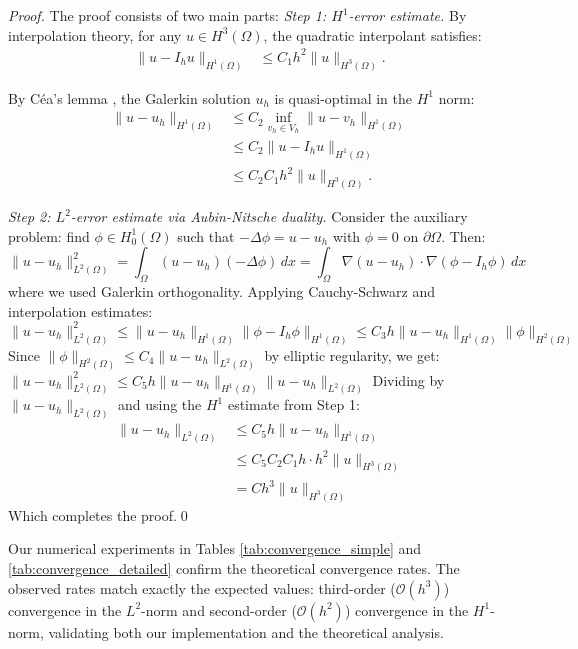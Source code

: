 \documentclass[a4paper,10pt]{article}
\begin{document}
\begin{proof}{}{}
	The proof consists of two main parts:
	\textit{Step 1: $H^1$-error estimate.}
	By interpolation theory, for any $u \in H^3(\Omega)$, the quadratic interpolant satisfies:
	\begin{align}
		\|u - I_h u\|_{H^1(\Omega)} & \leq C_1 h^2 \|u\|_{H^3(\Omega)}.
	\end{align}

	By Céa's lemma \cite{ciarlet1978finite}, the Galerkin solution $u_h$ is quasi-optimal in the $H^1$ norm:
	\begin{align}
		\|u - u_h\|_{H^1(\Omega)} & \leq C_2 \inf_{v_h \in V_h} \|u - v_h\|_{H^1(\Omega)} \\
		                          & \leq C_2 \|u - I_h u\|_{H^1(\Omega)}                  \\
		                          & \leq C_2 C_1 h^2 \|u\|_{H^3(\Omega)}.
	\end{align}

	\textit{Step 2: $L^2$-error estimate via Aubin-Nitsche duality.}
	Consider the auxiliary problem: find $\phi \in H^1_0(\Omega)$ such that $-\Delta \phi = u - u_h$ with $\phi = 0$ on $\partial\Omega$. Then:
	\[
		\|u - u_h\|^2_{L^2(\Omega)} = \int_\Omega (u - u_h)(-\Delta \phi) \, dx = \int_\Omega \nabla(u - u_h) \cdot \nabla(\phi - I_h\phi) \, dx
	\]
	where we used Galerkin orthogonality.
	Applying Cauchy-Schwarz and interpolation estimates:
	\[
		\|u - u_h\|^2_{L^2(\Omega)} \leq \|u - u_h\|_{H^1(\Omega)} \|\phi - I_h\phi\|_{H^1(\Omega)} \leq C_3 h \|u - u_h\|_{H^1(\Omega)} \|\phi\|_{H^2(\Omega)}
	\]
	Since $\|\phi\|_{H^2(\Omega)} \leq C_4 \|u - u_h\|_{L^2(\Omega)}$ by elliptic regularity, we get:
	\(
	\|u - u_h\|^2_{L^2(\Omega)} \leq C_5 h \|u - u_h\|_{H^1(\Omega)} \|u - u_h\|_{L^2(\Omega)}
	\)
	Dividing by $\|u - u_h\|_{L^2(\Omega)}$ and using the $H^1$ estimate from Step 1:
	\begin{align*}
		\|u - u_h\|_{L^2(\Omega)} & \leq C_5 h \|u - u_h\|_{H^1(\Omega)}             \\
		                          & \leq C_5 C_2 C_1 h \cdot h^2 \|u\|_{H^3(\Omega)} \\
		                          & = C h^3 \|u\|_{H^3(\Omega)}
	\end{align*}
	Which completes the proof.\qed
\end{proof}

Our numerical experiments in Tables \ref{tab:convergence_simple} and \ref{tab:convergence_detailed} confirm the theoretical convergence rates.
The observed rates match exactly the expected values: third-order ($\mathcal{O}(h^3)$) convergence in the $L^2$-norm and second-order ($\mathcal{O}(h^2)$) convergence in the $H^1$-norm, validating both our implementation and the theoretical analysis.
\end{document}
